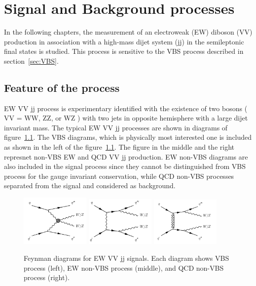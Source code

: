 \chapter{Signal and Background processes}
\label{chap:sigbkg}
In the following chapters, the measurement of an electroweak (EW) diboson (VV) production in association with a high-mass dijet system (jj) in the semileptonic final states is studied.
This process is sensitive to the VBS process described in section~\ref{sec:VBS}.
\section{Feature of the process}
EW VV jj process is experimentary identified with the existence of two bosons ( VV = WW, ZZ, or WZ ) with two jets in opposite hemisphere with a large dijet invariant mass.
The typical EW VV jj processes are shown in diagrams of figure~\ref{fig:feynmanEWVVjj}.
The VBS diagrams, which is physically most interested one is included as shown in the left of the figure~\ref{fig:feynmanEWVVjj}. The figure in the middle and the right represnet non-VBS EW and QCD VV jj production. EW non-VBS diagrams are also included in the signal process since they cannot be distinguished from VBS process for the gauge invariant conservation, while QCD non-VBS processes separated from the signal and considered as background.

\begin{figure}[H]
\begin{center}
 \includegraphics[width=0.3\textwidth,keepaspectratio]{figures/EWVVjj_a.png}
 \includegraphics[width=0.3\textwidth,keepaspectratio]{figures/EWVVjj_b.png}
 \includegraphics[width=0.3\textwidth,keepaspectratio]{figures/EWVVjj_c.png}

\caption[f]{
Feynman diagrams for EW VV jj signals. Each diagram shows VBS process (left), EW non-VBS process (middle), and QCD non-VBS process (right).
}
\label{fig:feynmanEWVVjj}
\end{center}
\end{figure}



